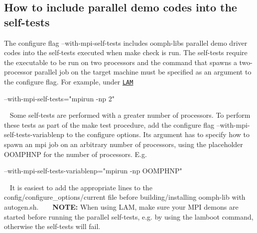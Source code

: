\hypertarget{index_self_tests}{}\subsection{How to include parallel demo codes into the self-\/tests}\label{index_self_tests}

\begin{DoxyItemize}
\item The configure flag {\ttfamily --with-\/mpi-\/self-\/tests} includes {\ttfamily oomph-\/lib\textquotesingle{}s} parallel demo driver codes into the self-\/tests executed when {\ttfamily make} {\ttfamily check} is run. The self-\/tests require the executable to be run on two processors and the command that spawns a two-\/processor parallel job on the target machine must be specified as an argument to the configure flag. For example, under \href{http://www.lam-mpi.org/}{\tt L\+AM} ~\newline
~\newline

\begin{DoxyCode}
--with-mpi-\textcolor{keyword}{self}-tests=\textcolor{stringliteral}{"mpirun -np 2"}
\end{DoxyCode}
 ~\newline
 Some self-\/tests are performed with a greater number of processors. To perform these tests as part of the {\ttfamily make} {\ttfamily test} procedure, add the configure flag {\ttfamily --with-\/mpi-\/self-\/tests-\/variablenp} to the configure options. Its argument has to specify how to spawn an mpi job on an arbitrary number of processors, using the placeholder {\ttfamily O\+O\+M\+P\+H\+NP} for the number of processors. E.\+g. ~\newline
~\newline

\begin{DoxyCode}
--with-mpi-\textcolor{keyword}{self}-tests-variablenp=\textcolor{stringliteral}{"mpirun -np OOMPHNP"}
\end{DoxyCode}
 ~\newline
 It is easiest to add the appropriate lines to the {\ttfamily config/configure\+\_\+options/current} file before building/installing {\ttfamily oomph-\/lib} with {\ttfamily autogen.\+sh}. ~\newline
~\newline
 {\bfseries N\+O\+TE\+:} When using L\+AM, make sure your M\+PI demons are started before running the parallel self-\/tests, e.\+g. by using the {\ttfamily lamboot} command, otherwise the self-\/tests will fail.
\end{DoxyItemize}



